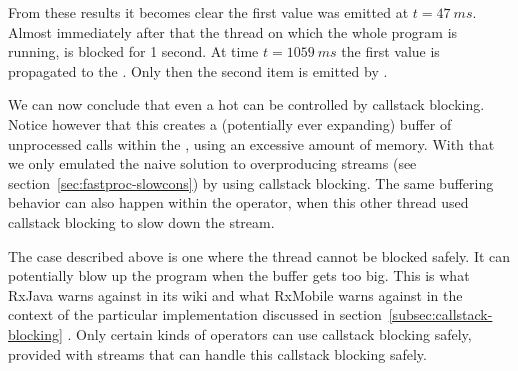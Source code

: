 From these results it becomes clear the first value was emitted at $t=47\ ms$. Almost immediately after that the thread on which the whole program is running, is blocked for 1 second. At time $t=1059\ ms$ the first value is propagated to the . Only then the second item is emitted by .

We can now conclude that even a hot \obs can be controlled by callstack blocking. Notice however that this creates a (potentially ever expanding) buffer of unprocessed  calls within the , using an excessive amount of memory. With that we only emulated the naive solution to overproducing streams (see section~\ref{sec:fastproc-slowcons}) by using callstack blocking. The same buffering behavior can also happen within the  operator, when this other thread used callstack blocking to slow down the stream.

The case described above is one where the thread cannot be blocked safely. It can potentially blow up the program when the buffer gets too big. This is what RxJava warns against in its wiki\cite{RxJava-Wiki-Callstack-Blocking} and what RxMobile warns against in the context of the particular  implementation discussed in section~\ref{subsec:callstack-blocking} \cite{RxMobile}. Only certain kinds of operators can use callstack blocking safely, provided with streams that can handle this callstack blocking safely.



























